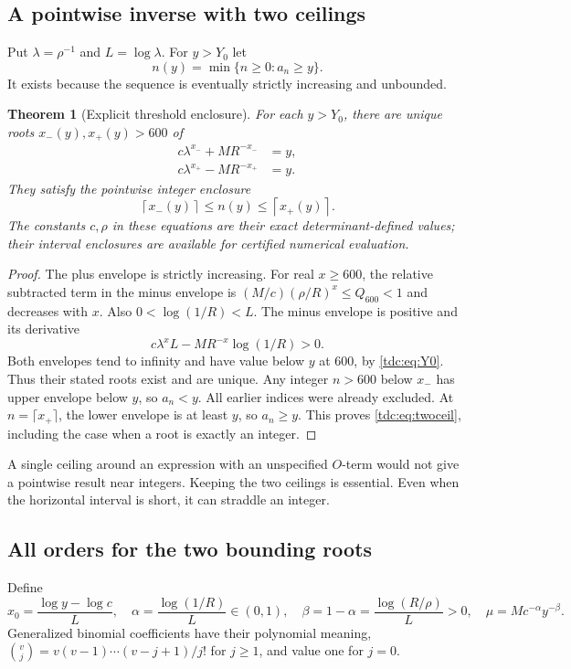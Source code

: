 \documentclass[11pt]{article}
\newtheorem{theorem}{Theorem}[section]
\theoremstyle{definition}\newtheorem{definition}[theorem]{Definition}
\theoremstyle{remark}\newtheorem{remark}[theorem]{Remark}
\begin{document}
\subsection{A pointwise inverse with two ceilings}
Put $\lambda=\rho^{-1}$ and $L=\log\lambda$. For $y>Y_0$ let
\[
 n(y)=\min\{n\ge0:a_n\ge y\}.
\]
It exists because the sequence is eventually strictly increasing and unbounded.

\begin{theorem}[Explicit threshold enclosure]\label{tdc:thm:inverse}
For each $y>Y_0$, there are unique roots $x_-(y),x_+(y)>600$ of
\begin{align}
 c\lambda^{x_-}+MR^{-x_-}&=y,\label{tdc:eq:upperroot}\\
 c\lambda^{x_+}-MR^{-x_+}&=y.\label{tdc:eq:lowerroot}
\end{align}
They satisfy the pointwise integer enclosure
\begin{equation}\label{tdc:eq:twoceil}
 \left\lceil x_-(y)\right\rceil\le n(y)\le
 \left\lceil x_+(y)\right\rceil.
\end{equation}
The constants $c,\rho$ in these equations are their exact determinant-defined values; their interval enclosures are available for certified numerical evaluation.
\end{theorem}
\begin{proof}
The plus envelope is strictly increasing. For real $x\ge600$, the relative subtracted term in the minus envelope is
$(M/c)(\rho/R)^x\le Q_{600}<1$ and decreases with $x$. Also
$0<\log(1/R)<L$. The minus envelope is positive and its derivative
\[
 c\lambda^x L-MR^{-x}\log(1/R)>0.
\]
Both envelopes tend to infinity and have value below $y$ at $600$, by \eqref{tdc:eq:Y0}. Thus their stated roots exist and are unique. Any integer $n>600$ below $x_-$ has upper envelope below $y$, so $a_n<y$. All earlier indices were already excluded. At $n=\lceil x_+\rceil$, the lower envelope is at least $y$, so $a_n\ge y$. This proves \eqref{tdc:eq:twoceil}, including the case when a root is exactly an integer.
\end{proof}

A single ceiling around an expression with an unspecified $O$-term would not give a pointwise result near integers. Keeping the two ceilings is essential. Even when the horizontal interval is short, it can straddle an integer.

\subsection{All orders for the two bounding roots}
Define
\begin{equation}\label{tdc:eq:inverseparams}
 x_0=\frac{\log y-\log c}{L},\quad
 \alpha=\frac{\log(1/R)}{L}\in(0,1),\quad
 \beta=1-\alpha=\frac{\log(R/\rho)}{L}>0,\quad
 \mu=Mc^{-\alpha}y^{-\beta}.
\end{equation}
Generalized binomial coefficients have their polynomial meaning,
$\binom{v}{j}=v(v-1)\cdots(v-j+1)/j!$ for $j\ge1$, and value one for $j=0$.
\end{document}
